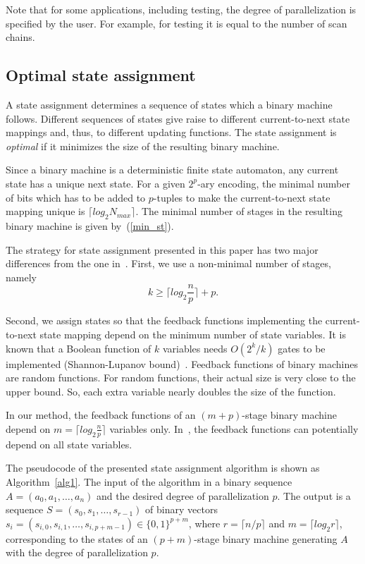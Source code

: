 \documentclass[10pt,conference]{IEEEtran}
\begin{document}
Note that for some applications, including testing,
the degree of parallelization is specified by the user.
For example, for testing it is equal to the number of scan chains. 

\subsection{Optimal state assignment}

A state assignment determines a sequence of states which a binary machine follows.
Different sequences of states give raise to different current-to-next state
mappings and, thus, to different updating functions. 
The state assignment is {\em optimal} if it minimizes the size 
of the resulting binary machine. 

Since a binary machine is a deterministic finite state automaton, any current state has a unique next state.
For a given $2^p$-ary encoding, the minimal number of bits which 
has to be added to $p$-tuples  
to make the current-to-next state mapping unique
is $\lceil log_2 N_{max} \rceil$. The minimal number of stages 
in the resulting binary machine is given by~(\ref{min_st}).

The strategy for state assignment presented in this paper 
has two major differences from the one in~\cite{Du11a}.
First, we use a non-minimal number of stages, namely
\begin{equation}
k \geq \lceil log_2 \frac{n}{p} \rceil + p.
\end{equation}


Second, we assign states so that the feedback functions implementing the current-to-next
state mapping depend on the minimum number of state variables.
It is known that a Boolean function of $k$ variables 
needs $O(2^k/k)$ gates to be implemented (Shannon-Lupanov bound)~\cite{We87}.
Feedback functions of binary machines are random functions. 
For random functions, their actual size is very close to the upper bound.
So, each extra variable nearly doubles the size of the function.

In our method, the feedback functions of an $(m+p)$-stage binary
machine depend on $m = \lceil log_2 \frac{n}{p} \rceil$
variables only.
In~\cite{Du11a}, the feedback functions can potentially
depend on all state variables.

The pseudocode of the presented state assignment algorithm is shown as Algorithm~\ref{alg1}. The input of the algorithm in a binary sequence $A = (a_0, a_1, \ldots, a_n)$
and the desired degree of parallelization $p$.
The output is a sequence $S = (s_0, s_1, \ldots, s_{r-1})$ of binary vectors 
$s_i = (s_{i,0}, s_{i,1}, \ldots, s_{i,p+m-1}) \in \{0,1\}^{p+m}$, where $r = \lceil n/p \rceil$ and $m = \lceil log_2 r \rceil$, corresponding to the states of an $(p+m)$-stage binary machine generating $A$ with the degree of parallelization $p$.
\end{document}
